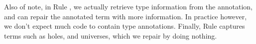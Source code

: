 Also of note, in Rule , we actually retrieve type
information from the annotation, and can repair the annotated term with more
information.  In practice however, we don't expect much code to contain type
annotations.  Finally, Rule  captures terms such as
holes, and universes, which we repair by doing nothing.


